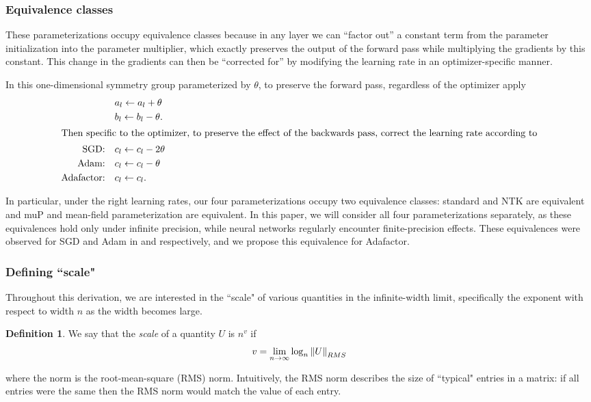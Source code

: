 \documentclass{article}
\theoremstyle{plain}
\theoremstyle{definition}
\newtheorem{appendixdef}{Definition}[section]
\theoremstyle{remark}
\begin{document}
\subsubsection{Equivalence classes}
\label{app:theory_equivalence_classes}
These parameterizations occupy equivalence classes because in any layer we can ``factor out'' a constant term from the parameter initialization into the parameter multiplier, which exactly preserves the output of the forward pass while multiplying the gradients by this constant. This change in the gradients can then be ``corrected for'' by modifying the learning rate in an optimizer-specific manner.

In this one-dimensional symmetry group parameterized by $\theta$, to preserve the forward pass, regardless of the optimizer apply
\begin{align*}
    &a_l \leftarrow a_l + \theta\MoveEqLeft[1]\\
    &b_l \leftarrow b_l - \theta.\\
\intertext{Then specific to the optimizer, to preserve the effect of the backwards pass, correct the learning rate according to}
    \textrm{SGD:}\quad&c_l \leftarrow c_l - 2\theta\\
    \textrm{Adam:}\quad&c_l \leftarrow c_l - \theta\\
    \textrm{Adafactor:}\quad&c_l \leftarrow c_l.
\end{align*}

In particular, under the right learning rates, our four parameterizations occupy two equivalence classes: standard and NTK are equivalent and muP and mean-field parameterization are equivalent. In this paper, we will consider all four parameterizations separately, as these equivalences hold only under infinite precision, while neural networks regularly encounter finite-precision effects. These equivalences were observed for SGD and Adam in \citet{yang2021tensoriv} and \citet{yang2023tensorivb} respectively, and we propose this equivalence for Adafactor.

\subsubsection{Defining ``scale"}
\label{app:theory_scale}
Throughout this derivation, we are interested in the ``scale" of various quantities in the infinite-width limit, specifically the exponent with respect to width $n$ as the width becomes large.

\begin{appendixdef}
We say that the \emph{scale} of a quantity $U$ is $n^v$ if 
\begin{align*}
v = \lim_{n \rightarrow \infty} \log_n \norm{U}_{RMS}
\end{align*}
\end{appendixdef}
where the norm is the root-mean-square (RMS) norm. Intuitively, the RMS norm describes the size of ``typical" entries in a matrix: if all entries were the same then the RMS norm would match the value of each entry.
\end{document}
